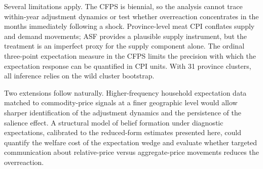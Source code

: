 Several limitations apply.
The CFPS is biennial, so the analysis cannot trace within-year
adjustment dynamics or test whether overreaction concentrates
in the months immediately following a shock.
Province-level meat CPI conflates supply and demand movements;
ASF provides a plausible supply instrument, but the treatment
is an imperfect proxy for the supply component alone.
The ordinal three-point expectation measure in the CFPS limits
the precision with which the expectation response can be
quantified in CPI units.
With 31 province clusters, all inference relies on the wild
cluster bootstrap.

Two extensions follow naturally.
Higher-frequency household expectation data matched to
commodity-price signals at a finer geographic level would allow
sharper identification of the adjustment dynamics and the
persistence of the salience effect.
A structural model of belief formation under diagnostic
expectations, calibrated to the reduced-form estimates presented
here, could quantify the welfare cost of the expectation wedge
and evaluate whether targeted communication about relative-price
versus aggregate-price movements reduces the overreaction.

